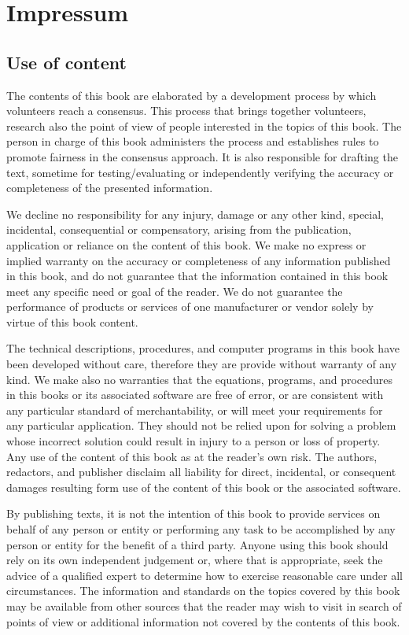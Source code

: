	\newpage
	\thispagestyle{empty}
	\mbox{}
	\section{Impressum}	
	\subsection{Use of content}
	The contents of this book are elaborated by a development process by which volunteers reach a consensus. This process that brings together volunteers, research also the point of view of people interested in the topics of this book. The person in charge of this book administers the process and establishes rules to promote fairness in the consensus approach. It is also responsible for drafting the text, sometime for testing/evaluating or independently verifying the accuracy or completeness of the presented information.

	We decline no responsibility for any injury, damage or any other kind, special, incidental, consequential or compensatory, arising from the publication, application or reliance on the content of this book. We make no express or implied warranty on the accuracy or completeness of any information published in this book, and do not guarantee that the information contained in this book meet any specific need or goal of the reader. We do not guarantee the performance of products or services of one manufacturer or vendor solely by virtue of this book content.
	
	The technical descriptions, procedures, and computer programs in this book have been developed without care, therefore they are provide without warranty of any kind. We make also no warranties that the equations, programs, and procedures in this books or its associated software are free of error, or are consistent with any particular standard of merchantability, or will meet your requirements for any particular application. They should not be relied upon for solving a problem whose incorrect solution could result in injury to a person or loss of property. Any use of the content of this book as at the reader's own risk. The authors, redactors, and publisher disclaim all liability for direct, incidental, or consequent damages resulting form use of the content of this book or the associated software.

	By publishing texts, it is not the intention of this book to provide services on behalf of any person or entity or performing any task to be accomplished by any person or entity for the benefit of a third party. Anyone using this book should rely on its own independent judgement or, where that is appropriate, seek the advice of a qualified expert to determine how to exercise reasonable care under all circumstances. The information and standards on the topics covered by this book may be available from other sources that the reader may wish to visit in search of points of view or additional information not covered by the contents of this book.

